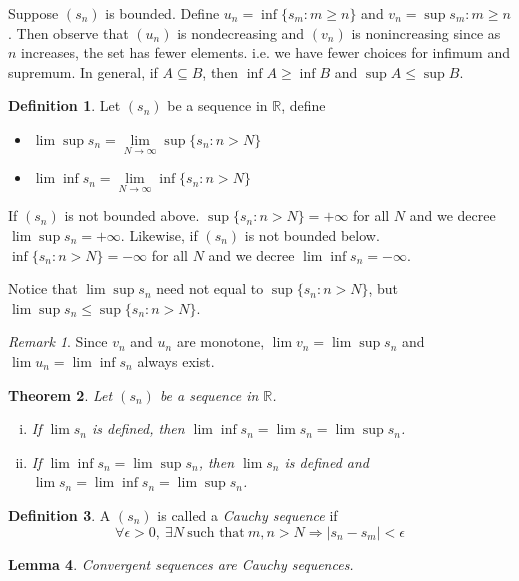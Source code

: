 \documentclass[12pt, lettersize]{book}
\theoremstyle{plain}
\newtheorem{thm}{Theorem}[section]
\newtheorem{lem}[thm]{Lemma}
\theoremstyle{definition}
\newtheorem{dfn}[thm]{Definition}
\theoremstyle{remark}
\newtheorem*{rem}{Remark}
\begin{document}
	Suppose $(s_n)$ is bounded. Define $u_n=\inf\{s_m: m\geq n\}$ and $v_n=\sup{s_m: m\geq n}$. Then observe that $(u_n)$ is nondecreasing and $(v_n)$ is nonincreasing since as $n$ increases, the set has fewer elements. i.e. we have fewer choices for infimum and supremum. In general, if $A\subseteq B$, then $\inf A\geq \inf B$ and $\sup A\leq \sup B$.
	
	\begin{dfn}
		Let $(s_n)$ be a sequence in $\mathbb{R}$, define
		\begin{itemize}
			\item $\lim\sup s_n=\lim\limits_{N\rightarrow\infty}\sup\{s_n: n>N\}$
			\item $\lim\inf s_n=\lim\limits_{N\rightarrow\infty}\inf\{s_n: n>N\}$
		\end{itemize}
	\end{dfn}
	If $(s_n)$ is not bounded above. $\sup\{s_n: n>N\}=+\infty$ for all $N$ and we decree $\lim\sup s_n=+\infty$.
	Likewise, if $(s_n)$ is not bounded below. $\inf\{s_n: n>N\}=-\infty$ for all $N$ and we decree $\lim\inf s_n=-\infty$.
	
	Notice that $\lim\sup s_n$ need not equal to $\sup\{s_n: n>N\}$, but $\lim\sup s_n\leq\sup\{s_n: n>N\}$.
	\begin{rem}
		Since $v_n$ and $u_n$ are monotone, $\lim v_n=\lim\sup s_n$ and $\lim u_n=\lim\inf s_n$ always exist.
	\end{rem}
	\newpage
	
	\begin{thm}\label{def:condition for limit}
		Let $(s_n)$ be a sequence in $\mathbb{R}$.
		\begin{enumerate}[(i)]
			\item If $\lim s_n$ is defined, then $\lim\inf s_n=\lim s_n=\lim\sup s_n$.
			\item If $\lim\inf s_n=\lim\sup s_n$, then $\lim s_n$ is defined and $\lim s_n=\lim\inf s_n=\lim\sup s_n$.
		\end{enumerate}
	\end{thm}
	
	\begin{dfn}\label{def:cauchy-seq}
		A $(s_n)$ is called a \emph{Cauchy sequence} if 
		\begin{displaymath}
			\forall\epsilon>0,\ \exists N\ \text{such that}\ m,n>N\Rightarrow|s_n-s_m|<\epsilon
		\end{displaymath}
	\end{dfn}
	\begin{lem}
		Convergent sequences are Cauchy sequences.
	\end{lem}
	
\end{document}
